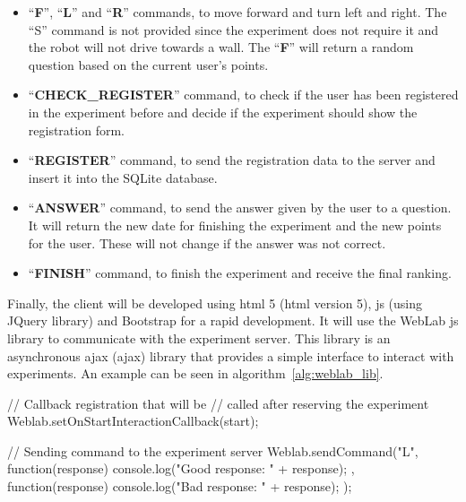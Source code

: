 \begin{itemize}
	\item ``\textbf{F}'', ``\textbf{L}'' and ``\textbf{R}'' commands, to move forward and turn left
	and right. The ``S'' command is not provided since the experiment does not require it and the
	robot will not drive towards a wall. The ``\textbf{F}'' will return a random question based on
	the current user's points.

	\item ``\textbf{CHECK\_REGISTER}'' command, to check if the user has been registered in the
	experiment before and decide if the experiment should show the registration form.

	\item ``\textbf{REGISTER}'' command, to send the registration data to the server and insert it
	into the SQLite database.

	\item ``\textbf{ANSWER}'' command, to send the answer given by the user to a question. It will
	return the new date for finishing the experiment and the new points for the user. These will not
	change if the answer was not correct.

	\item ``\textbf{FINISH}'' command, to finish the experiment and receive the final ranking.
\end{itemize}

Finally, the client will be developed using \acrshort{html} 5 (\acrlong{html} version 5),
\acrlong{js} (using JQuery library) and Bootstrap for a rapid development. It will use the WebLab
\acrlong{js} library to communicate with the experiment server. This library is an asynchronous
\acrshort{ajax} (\acrlong{ajax}) library that provides a simple interface to interact with
experiments. An example can be seen in algorithm~\ref{alg:weblab_lib}.

\begin{center}
\begin{minipage}{.9\textwidth}
\singlespace
{}
\begin{pyglist}[language=javascript, caption={WebLab \acrlong{js} library example.},
	label={alg:weblab_lib}, listingname={Algorithm}, numbers=left]
// Callback registration that will be
// called after reserving the experiment
Weblab.setOnStartInteractionCallback(start);

// Sending command to the experiment server
Weblab.sendCommand("L", function(response) {
    console.log("Good response: " + response);
}, function(response) {
    console.log("Bad response: " + response);
});
\end{pyglist}
\end{minipage}
\end{center}

